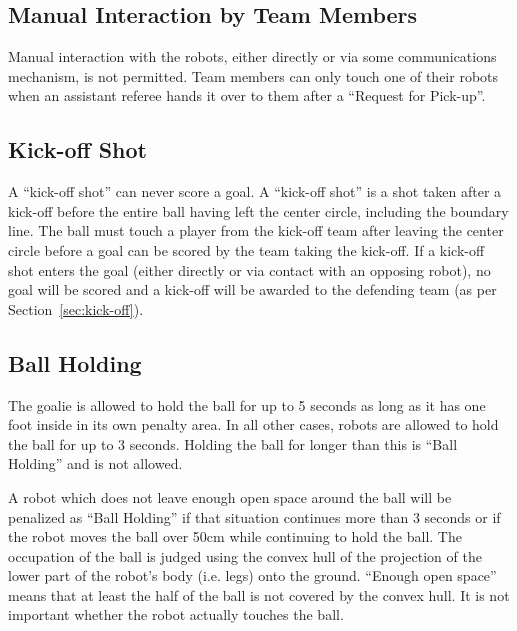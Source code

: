 \documentclass[12pt]{article}
\begin{document}
\subsection{Manual Interaction by Team Members}

Manual interaction with the robots, either directly or via some
communications mechanism, is not permitted. Team members can only
touch one of their robots when an assistant referee hands it over to
them after a ``Request for Pick-up''.

\subsection{Kick-off Shot}
\label{sec:kick-off_shot}

A ``kick-off shot'' can never score a goal.  A ``kick-off shot'' is
a shot taken after a kick-off before the entire ball having left the
center circle, including the boundary line.  The ball must touch a
player from the kick-off team after leaving the center circle before
a goal can be scored by the team taking the kick-off.  If a kick-off
shot enters the goal (either directly or via contact with an
opposing robot), no goal will be scored and a kick-off will be
awarded to the defending team (as per Section~\ref{sec:kick-off}).


\subsection{Ball Holding}
\label{sec:ball_holding}

The goalie is allowed to hold the ball for up to 5 seconds as long
as it has one foot inside in its own penalty area.  In all other
cases, robots are allowed to hold the ball for up to 3 seconds.
Holding the ball for longer than this is ``Ball Holding'' and is not
allowed.

A robot which does not leave enough open space around the ball will
be penalized as ``Ball Holding'' if that situation continues more
than 3 seconds or if the robot moves the ball over 50cm while continuing
to hold the ball. The occupation of the ball is judged using the convex hull of the projection of the lower part of the robot's body (i.e. legs) onto the ground. ``Enough open space'' means that at least the half of the ball is not covered by the convex hull. It is not important whether the robot actually touches the ball.
\end{document}
